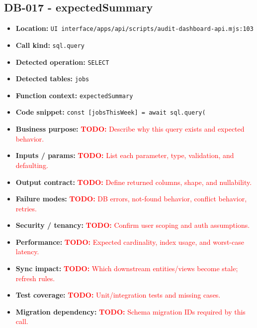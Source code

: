 \documentclass[11pt]{article}
\newcommand{\todoitem}[1]{\textcolor{red}{\textbf{TODO:} #1}}
\begin{document}
\subsection{DB-017 - expectedSummary}
\begin{itemize}[leftmargin=1.5em]
\item \textbf{Location:} \texttt{UI interface/apps/api/scripts/audit-dashboard-api.mjs:103}
\item \textbf{Call kind:} \texttt{sql.query}
\item \textbf{Detected operation:} \texttt{SELECT}
\item \textbf{Detected tables:} \texttt{jobs}
\item \textbf{Function context:} \texttt{expectedSummary}
\item \textbf{Code snippet:} \texttt{const [jobsThisWeek] = await sql.query(}
\item \textbf{Business purpose:} \todoitem{Describe why this query exists and expected behavior.}
\item \textbf{Inputs / params:} \todoitem{List each parameter, type, validation, and defaulting.}
\item \textbf{Output contract:} \todoitem{Define returned columns, shape, and nullability.}
\item \textbf{Failure modes:} \todoitem{DB errors, not-found behavior, conflict behavior, retries.}
\item \textbf{Security / tenancy:} \todoitem{Confirm user scoping and auth assumptions.}
\item \textbf{Performance:} \todoitem{Expected cardinality, index usage, and worst-case latency.}
\item \textbf{Sync impact:} \todoitem{Which downstream entities/views become stale; refresh rules.}
\item \textbf{Test coverage:} \todoitem{Unit/integration tests and missing cases.}
\item \textbf{Migration dependency:} \todoitem{Schema migration IDs required by this call.}
\end{itemize}
\end{document}
